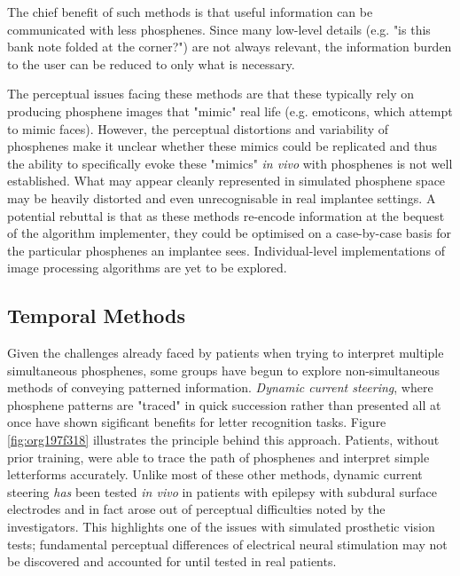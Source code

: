 \documentclass[a4paper,11pt,openany]{book}
\begin{document}
The chief benefit of such methods is that useful information can be communicated with less phosphenes.
Since many low-level details (e.g. "is this bank note folded at the corner?") are not always relevant, the information burden to the user can be reduced to only what is necessary.

The perceptual issues facing these methods are that these typically rely on producing phosphene images that "mimic" real life (e.g. emoticons, which attempt to mimic faces). \cite{lui_transformative_2012}
However, the perceptual distortions and variability of phosphenes make it unclear whether these mimics could be replicated and thus the ability to specifically evoke these "mimics" \emph{in vivo} with phosphenes is not well established.
What may appear cleanly represented in simulated phosphene space may be heavily distorted and even unrecognisable in real implantee settings.
A potential rebuttal is that as these methods re-encode information at the bequest of the algorithm implementer, they could be optimised on a case-by-case basis for the particular phosphenes an implantee sees.
Individual-level implementations of image processing algorithms are yet to be explored.

\subsection*{Temporal Methods}
\label{sec:org169525b}

Given the challenges already faced by patients when trying to interpret multiple simultaneous phosphenes, some groups have begun to explore non-simultaneous methods of conveying patterned information.
\emph{Dynamic current steering}, where phosphene patterns are "traced" in quick succession rather than presented all at once have shown sigificant benefits for letter recognition tasks. \cite{beauchamp_dynamic_2018,spencer_creating_2018}
Figure \ref{fig:org197f318} illustrates the principle behind this approach.
Patients, without prior training, were able to trace the path of phosphenes and interpret simple letterforms accurately.
Unlike most of these other methods, dynamic current steering \emph{has} been tested \emph{in vivo} in patients with epilepsy with subdural surface electrodes and in fact arose out of perceptual difficulties noted by the investigators. \cite{beauchamp_dynamic_2018}
This highlights one of the issues with simulated prosthetic vision tests; fundamental perceptual differences of electrical neural stimulation may not be discovered and accounted for until tested in real patients.
\end{document}
